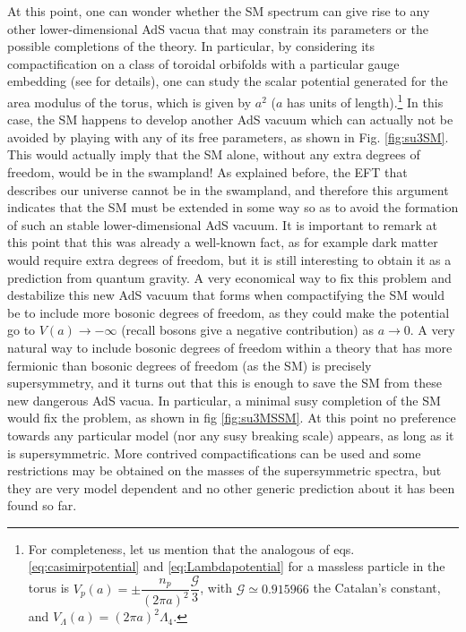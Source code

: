 \documentclass[11pt,a4paper]{article}
\begin{document}
At this point, one can wonder whether the SM spectrum can give rise to any other lower-dimensional AdS vacua that may constrain its parameters or the possible completions of the theory. In particular, by considering its compactification on a class of toroidal orbifolds with a particular gauge embedding (see \cite{Gonzalo:2018tpb} for details), one can study the scalar potential generated for the area modulus of the torus, which is given by $a^2$ ($a$ has units of length).\footnote{For completeness, let us mention that the analogous of eqs. \eqref{eq:casimirpotential} and \eqref{eq:Lambdapotential} for a massless particle in the torus is $V_p(a)=\pm \dfrac{n_p}{\left( 2 \pi a \right)^2}\dfrac{\mathcal{G}}{3}$, with $\mathcal{G}\simeq 0.915966$ the Catalan's constant, and $V_{\Lambda}(a)=\left( 2 \pi a \right)^2 \Lambda_4$.} In this case, the SM happens to develop another AdS vacuum which can actually not be avoided by playing with any of its free parameters, as shown in Fig. \ref{fig:su3SM}. This would actually imply that the SM alone, without any extra degrees of freedom, would be in the swampland! As explained before, the EFT that describes our universe cannot be in the swampland, and therefore this argument indicates that the SM must be extended in some way so as to avoid the formation of such an stable lower-dimensional AdS vacuum. It is important to remark at this point that this was already a well-known fact, as for example dark matter would require extra degrees of freedom, but it is still interesting to obtain it as a prediction from quantum gravity. A very economical way to fix this problem and destabilize this new AdS vacuum that forms when compactifying the SM would be to include more bosonic degrees of freedom, as they could make the potential go to $V(a) \rightarrow  - \infty$ (recall bosons give a negative contribution) as $a \rightarrow 0$. A very natural way to include bosonic degrees of freedom within a theory that has more fermionic than bosonic degrees of freedom (as the SM) is precisely supersymmetry, and it turns out that this is enough to save the SM from these new dangerous AdS vacua. In particular, a minimal susy completion of the SM would fix the problem, as shown in fig \ref{fig:su3MSSM}. At this point no preference towards any particular model (nor any susy breaking scale) appears, as long as it is supersymmetric. More contrived compactifications can be used and some restrictions may be obtained on the masses of the supersymmetric spectra, but they are very model dependent and no other generic prediction about it has been found so far.
\end{document}
